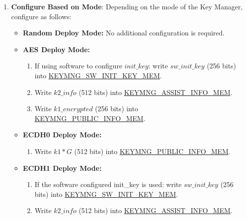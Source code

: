 \documentclass[main\_\_EN.tex]{subfiles}
\begin{document}
\begin{enumerate}
    \item \textbf{Configure Based on Mode}: Depending on the mode of the Key Manager, configure as follows:
    \begin{itemize}
        \item \textbf{Random Deploy Mode:} No additional configuration is required.
        \item \textbf{AES Deploy Mode:} 
        \begin{enumerate}
            \item If using software to configure \begin{math}init\_key\end{math}: write \begin{math}sw\_init\_key\end{math} (256 bits) into \hyperref[mem:keymng-sw-init-key]{KEYMNG\_SW\_INIT\_KEY\_MEM}.
            \item Write \begin{math}k2\_info\end{math} (512 bits) into \hyperref[mem:keymng-assist-info]{KEYMNG\_ASSIST\_INFO\_MEM}.
            \item Write \begin{math}k1\_encrypted\end{math} (256 bits) into \hyperref[mem:keymng-public-info]{KEYMNG\_PUBLIC\_INFO\_MEM}.
        \end{enumerate}
        \item \textbf{ECDH0 Deploy Mode:}
        \begin{enumerate}
            \item Write \begin{math}k1*G\end{math} (512 bits) into \hyperref[mem:keymng-public-info]{KEYMNG\_PUBLIC\_INFO\_MEM}.
        \end{enumerate}
        \item \textbf{ECDH1 Deploy Mode:}
        \begin{enumerate}
            \item If the software configured init\_key is used: write \begin{math}sw\_init\_key\end{math} (256 bits) into \hyperref[mem:keymng-sw-init-key]{KEYMNG\_SW\_INIT\_KEY\_MEM}.
            \item Write \begin{math}k2\_info\end{math} (512 bits) into \hyperref[mem:keymng-assist-info]{KEYMNG\_ASSIST\_INFO\_MEM}.

\end{enumerate}
\end{itemize}
\end{enumerate}
\end{document}
